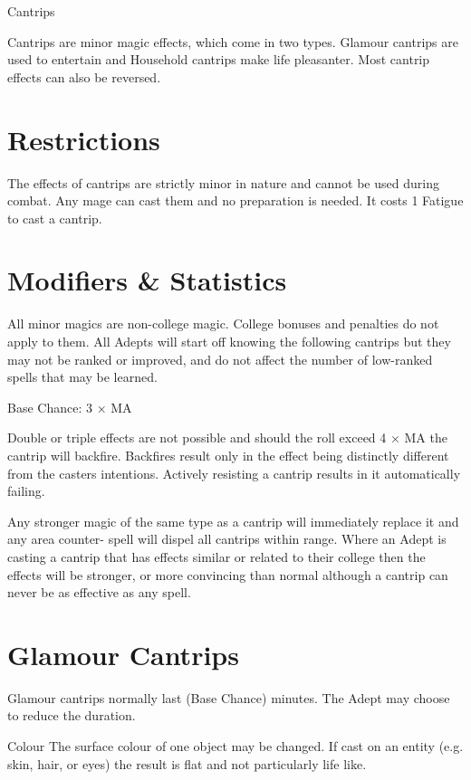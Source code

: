 \begin{Chapter}{Cantrips}

Cantrips are minor magic effects, which come in two types.  Glamour
cantrips are used to entertain and Household cantrips make life
pleasanter. Most cantrip effects can also be reversed.


\section{Restrictions}

The effects of cantrips are strictly minor in nature and cannot be
used during combat.  Any mage can cast them and no preparation is
needed.  It costs 1 Fatigue to cast a cantrip.


\section{Modifiers \& Statistics}

All minor magics are non-college magic.  College bonuses and penalties
do not apply to them.  All Adepts will start off knowing the following
cantrips but they may not be ranked or improved, and do not affect the
number of low-ranked spells that may be learned.

Base Chance: 3 × MA 

Double or triple effects are not possible and should the roll exceed 4
× MA the cantrip will backfire.  Backfires result only in the effect
being distinctly different from the casters intentions.  Actively
resisting a cantrip results in it automatically failing.

Any stronger magic of the same type as a cantrip will immediately
replace it and any area counter- spell will dispel all cantrips within
range. Where an Adept is casting a cantrip that has effects similar or
related to their college then the effects will be stronger, or more
convincing than normal although a cantrip can never be as effective as
any spell.


\section{Glamour Cantrips}

  Glamour cantrips normally last (Base Chance) minutes.  The Adept may
choose to reduce the duration.

\begin{Description}

\item[Colour] The surface colour of one object may be changed.  If
  cast on an entity (e.g.  skin, hair, or eyes) the result is flat and
  not particularly life like.


\end{Description}
\end{Chapter}
